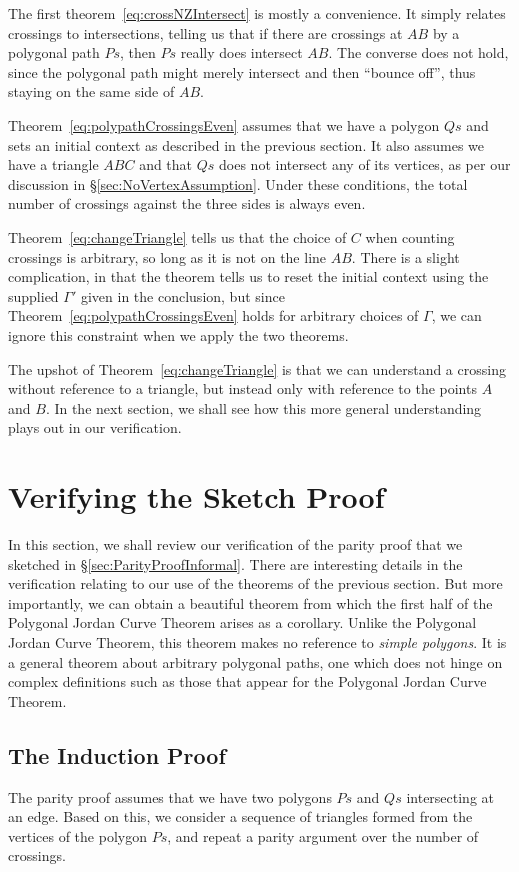 The first theorem~\eqref{eq:crossNZIntersect} is mostly a convenience. It simply relates crossings to intersections, telling us that if there are crossings at $AB$ by a polygonal path $Ps$, then $Ps$ really does intersect $AB$. The converse does not hold, since the polygonal path might merely intersect and then ``bounce off'', thus staying on the same side of $AB$.

Theorem~\ref{eq:polypathCrossingsEven} assumes that we have a polygon $Qs$ and sets an initial context as described in the previous section. It also assumes we have a triangle $ABC$ and that $Qs$ does not intersect any of its vertices, as per our discussion in \S\ref{sec:NoVertexAssumption}. Under these conditions, the total number of crossings against the three sides is always even.

Theorem~\ref{eq:changeTriangle} tells us that the choice of $C$ when counting
crossings is arbitrary, so long as it is not on the line $AB$. There is a slight
complication, in that the theorem tells us to reset the initial context using the
supplied $\Gamma'$ given in the conclusion, but since
Theorem~\ref{eq:polypathCrossingsEven} holds for arbitrary choices of $\Gamma$, we
can ignore this constraint when we apply the two theorems.

The upshot of Theorem~\ref{eq:changeTriangle} is that we can understand a crossing without reference to a triangle, but instead only with reference to the points $A$ and $B$. In the next section, we shall see how this more general understanding plays out in our verification.

\section{Verifying the Sketch Proof}
In this section, we shall review our verification of the parity proof that we sketched in \S\ref{sec:ParityProofInformal}. There are interesting details in the verification relating to our use of the theorems of the previous section. But more importantly, we can obtain a beautiful theorem from which the first half of the Polygonal Jordan Curve Theorem arises as a corollary. Unlike the Polygonal Jordan Curve Theorem, this theorem makes no reference to \emph{simple polygons}. It is a general theorem about arbitrary polygonal paths, one which does not hinge on complex definitions such as those that appear for the Polygonal Jordan Curve Theorem.

\subsection{The Induction Proof}\label{sec:InductionProof}
The parity proof assumes that we have two polygons $Ps$ and $Qs$ intersecting at an edge. Based on this, we consider a sequence of triangles formed from the vertices of the polygon $Ps$, and repeat a parity argument over the number of crossings.

